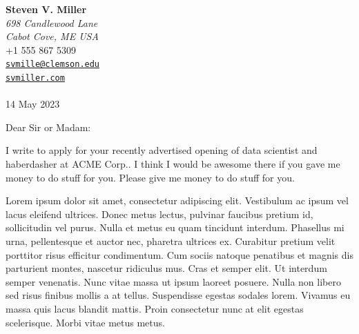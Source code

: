 \documentclass[
  11pt,
]{article}
\author{Steven V. Miller}
\date{14 May 2023}
\date{}
\begin{document}
\hfill
\begin{minipage}[t]{1\textwidth}
\raggedleft%
{\bfseries Steven V. Miller }\\[.35ex]
\emph{\small 698 Candlewood Lane\\
Cabot Cove, ME USA} \\[.35ex]
\faPhone \hspace{1 mm} \small{+1 555 867 5309} \\ 
\faEnvelopeO \hspace{1 mm} \small{\tt \href{mailto:svmille@clemson.edu}{\nolinkurl{svmille@clemson.edu}}} \\ 
\faGlobe \hspace{1 mm} \small{\href{http://svmiller.com}{\tt svmiller.com}}\\ 
\hspace{1cm} \\
 14 May 2023 \\ 
\end{minipage}


\vspace*{1em}

Dear Sir or Madam:

\vspace*{1em}

 

% 
% 

% 
I write to apply for your recently advertised opening of data scientist
and haberdasher at ACME Corp.. I think I would be awesome there if you
gave me money to do stuff for you. Please give me money to do stuff for
you.

Lorem ipsum dolor sit amet, consectetur adipiscing elit. Vestibulum ac
ipsum vel lacus eleifend ultrices. Donec metus lectus, pulvinar faucibus
pretium id, sollicitudin vel purus. Nulla et metus eu quam tincidunt
interdum. Phasellus mi urna, pellentesque et auctor nec, pharetra
ultrices ex. Curabitur pretium velit porttitor risus efficitur
condimentum. Cum sociis natoque penatibus et magnis dis parturient
montes, nascetur ridiculus mus. Cras et semper elit. Ut interdum semper
venenatis. Nunc vitae massa ut ipsum laoreet posuere. Nulla non libero
sed risus finibus mollis a at tellus. Suspendisse egestas sodales lorem.
Vivamus eu massa quis lacus blandit mattis. Proin consectetur nunc at
elit egestas scelerisque. Morbi vitae metus metus.
\end{document}
